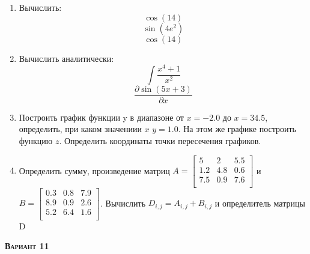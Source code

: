 \begin{enumerate}
\item Вычислить: 
\begin{equation*}\cos(14)                          \end{equation*}
\begin{equation*}\sin(4 e^2)                       \end{equation*}
\begin{equation*}\cos(14)                          \end{equation*}

\item Вычислить аналитически: 
 \begin{equation*} \int \dfrac{x^4+1}{x^2} \end{equation*}\begin{equation*} {\dfrac{\partial \sin(5 x +3)}{\partial x}} \end{equation*}
\item Построить график функции y в диапазоне от $x=-2.0$ до $x=34.5$, определить, при каком значениии $x$ $y=1.0$. На этом же графике построить функцию $z $. Определить координаты точки пересечения графиков. \item Определить сумму, произведение матриц $A=\begin{bmatrix}
5 &2 &5.5 \\
1.2 &4.8 &0.6 \\
7.5 &0.9 &7.6 \\
\end{bmatrix}
$ и $B=\begin{bmatrix}
0.3 &0.8 &7.9 \\
8.9 &0.9 &2.6 \\
5.2 &6.4 &1.6 \\
\end{bmatrix}
$. Вычислить $D_{i,j}=A_{i,j} + B_{i,j}$ и определитель матрицы D
\end{enumerate}
\textsc{\textbf{Вариант 11}}

